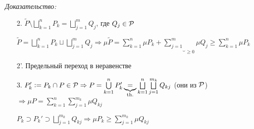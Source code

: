 \documentclass[12pt]{article}
\begin{document}
\textit{Доказательство:}

\begin{enumerate}
    \item[2.] $\tilde{P} \setminus \bigsqcup\limits_{k = 1}^n P_k = \bigsqcup\limits_{j = 1}^m Q_j$, где $Q_j \in \P$
    
    $\tilde{P} = \bigsqcup\limits_{k = 1}^n P_k \sqcup \bigsqcup\limits_{j = 1}^m Q_j \Rightarrow \mu \tilde{P} = \sum\limits_{k = 1}^n \mu P_k + \underbrace{\sum\limits_{j = 1}^m}_{\geq 0} \mu Q_j \geq \sum\limits_{k = 1}^n \mu P_k$

    \item[2'.] Предельный переход в неравенстве
    
    \item[3.] $P'_k := P_k \cap P \in \P \Rightarrow P = \bigcup\limits_{k = 1}^n P_k' \underbrace{=}_\text{th.} \bigsqcup\limits_{k = 1}^n \bigsqcup\limits_{j = 1}^{m_k} Q_{kj}$ (они из $\P$) $\Rightarrow \mu P = \sum\limits_{k = 1}^n \sum\limits_{j = 1}^{m_k} \mu Q_{kj}$
    
    $P_k \supset P_k' \supset \bigsqcup\limits_{j = 1}^{m_k} Q_{kj} \Rightarrow \mu P_k \geq \sum\limits_{j = 1}^{m_k} \mu Q_{kj}$
\end{enumerate}
\end{document}

